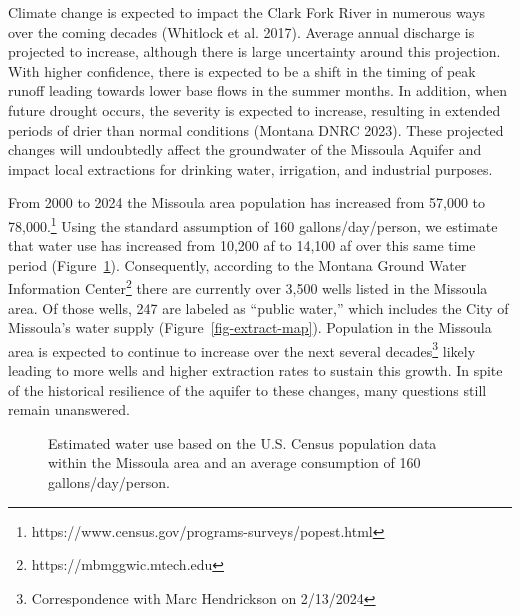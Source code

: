 \documentclass[
  letterpaper,
  DIV=11,
  numbers=noendperiod]{scrartcl}
\begin{document}
Climate change is expected to impact the Clark Fork River in numerous
ways over the coming decades (Whitlock et al. 2017). Average annual
discharge is projected to increase, although there is large uncertainty
around this projection. With higher confidence, there is expected to be
a shift in the timing of peak runoff leading towards lower base flows in
the summer months. In addition, when future drought occurs, the severity
is expected to increase, resulting in extended periods of drier than
normal conditions (Montana DNRC 2023). These projected changes will
undoubtedly affect the groundwater of the Missoula Aquifer and impact
local extractions for drinking water, irrigation, and industrial
purposes.

From 2000 to 2024 the Missoula area population has increased from 57,000
to 78,000.\footnote{https://www.census.gov/programs-surveys/popest.html}
Using the standard assumption of 160 gallons/day/person, we estimate
that water use has increased from 10,200 af to 14,100 af over this same
time period (Figure~\ref{fig-water-use}). Consequently, according to the
Montana Ground Water Information Center\footnote{https://mbmggwic.mtech.edu}
there are currently over 3,500 wells listed in the Missoula area. Of
those wells, 247 are labeled as ``public water,'' which includes the
City of Missoula's water supply (Figure~\ref{fig-extract-map}).
Population in the Missoula area is expected to continue to increase over
the next several decades\footnote{Correspondence with Marc Hendrickson
  on 2/13/2024} likely leading to more wells and higher extraction rates
to sustain this growth. In spite of the historical resilience of the
aquifer to these changes, many questions still remain unanswered.

\begin{figure}


\caption{\label{fig-water-use}Estimated water use based on the U.S.
Census population data within the Missoula area and an average
consumption of 160 gallons/day/person.}

\end{figure}%
\end{document}
